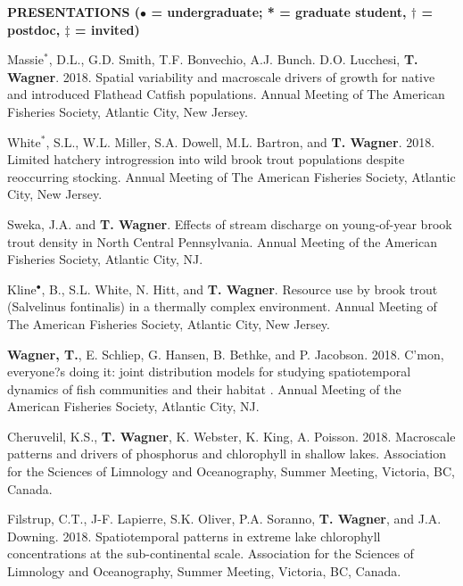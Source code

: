 \documentclass[10pt]{article}
\begin{document}
\begin{flushleft}
\vspace{8pt}
\centerline {\bf{PRESENTATIONS ({\small $\bullet$ = undergraduate; * = graduate student, $\dagger$ = postdoc, $\ddagger$ = invited})}}
\vspace{5pt}
\begin{etaremune}

\item Massie$^*$, D.L., G.D. Smith, T.F. Bonvechio, A.J. Bunch. D.O. Lucchesi, {\bf T. Wagner}. 2018. Spatial variability and macroscale drivers of growth for native and introduced Flathead Catfish populations. Annual Meeting of The American Fisheries Society, Atlantic City, New Jersey.

\item White$^*$, S.L., W.L. Miller, S.A. Dowell, M.L. Bartron, and {\bf T. Wagner}. 2018. Limited hatchery introgression into wild brook trout populations despite reoccurring stocking. Annual Meeting of The American Fisheries Society, Atlantic City, New Jersey.

\item Sweka, J.A. and {\bf T. Wagner}. Effects of stream discharge on young-of-year brook trout density in North Central Pennsylvania. Annual Meeting of the American Fisheries Society, Atlantic City, NJ.

\item Kline$^\bullet$, B., S.L. White, N. Hitt, and {\bf T. Wagner}. Resource use by brook trout (Salvelinus fontinalis) in a thermally complex environment. Annual Meeting of The American Fisheries Society, Atlantic City, New Jersey.

\item {\bf Wagner, T.}, E. Schliep, G. Hansen, B. Bethke, and P. Jacobson. 2018. C'mon, everyone?s doing it: joint distribution models for studying spatiotemporal dynamics of fish communities and their habitat . Annual Meeting of the American Fisheries Society, Atlantic City, NJ.

\item Cheruvelil, K.S., {\bf T. Wagner}, K. Webster, K. King, A. Poisson. 2018. Macroscale patterns and drivers of phosphorus and chlorophyll in shallow lakes. Association for the Sciences of Limnology and Oceanography, Summer Meeting, Victoria, BC, Canada.

\item Filstrup, C.T., J-F. Lapierre, S.K. Oliver, P.A. Soranno, {\bf T. Wagner}, and J.A. Downing. 2018. Spatiotemporal patterns in extreme lake chlorophyll concentrations at the sub-continental scale. Association for the Sciences of Limnology and Oceanography, Summer Meeting, Victoria, BC, Canada.


\end{etaremune}
\end{flushleft}
\end{document}
